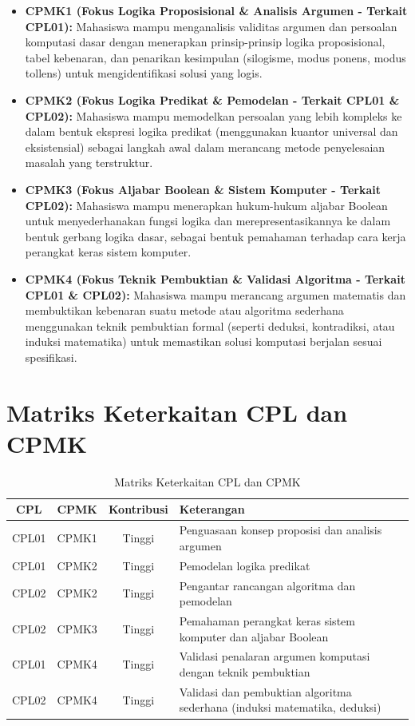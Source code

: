 \begin{itemize}
  \item \textbf{CPMK1 (Fokus Logika Proposisional \& Analisis Argumen - Terkait CPL01):} Mahasiswa mampu menganalisis validitas argumen dan persoalan komputasi dasar dengan menerapkan prinsip-prinsip logika proposisional, tabel kebenaran, dan penarikan kesimpulan (silogisme, modus ponens, modus tollens) untuk mengidentifikasi solusi yang logis.
  
  \item \textbf{CPMK2 (Fokus Logika Predikat \& Pemodelan - Terkait CPL01 \& CPL02):} Mahasiswa mampu memodelkan persoalan yang lebih kompleks ke dalam bentuk ekspresi logika predikat (menggunakan kuantor universal dan eksistensial) sebagai langkah awal dalam merancang metode penyelesaian masalah yang terstruktur.
  
  \item \textbf{CPMK3 (Fokus Aljabar Boolean \& Sistem Komputer - Terkait CPL02):} Mahasiswa mampu menerapkan hukum-hukum aljabar Boolean untuk menyederhanakan fungsi logika dan merepresentasikannya ke dalam bentuk gerbang logika dasar, sebagai bentuk pemahaman terhadap cara kerja perangkat keras sistem komputer.
  
  \item \textbf{CPMK4 (Fokus Teknik Pembuktian \& Validasi Algoritma - Terkait CPL01 \& CPL02):} Mahasiswa mampu merancang argumen matematis dan membuktikan kebenaran suatu metode atau algoritma sederhana menggunakan teknik pembuktian formal (seperti deduksi, kontradiksi, atau induksi matematika) untuk memastikan solusi komputasi berjalan sesuai spesifikasi.
\end{itemize}

\section*{Matriks Keterkaitan CPL dan CPMK}

\begin{table}[H]
\centering
\begin{tabular}{|c|c|c|>{\raggedright\arraybackslash}p{5.5cm}|}
  \hline
  \textbf{CPL} & \textbf{CPMK} & \textbf{Kontribusi} & \textbf{Keterangan} \\
  \hline
  CPL01 & CPMK1 & Tinggi & Penguasaan konsep proposisi dan analisis argumen \\
  \hline
  CPL01 & CPMK2 & Tinggi & Pemodelan logika predikat \\
  \hline
  CPL02 & CPMK2 & Tinggi & Pengantar rancangan algoritma dan pemodelan \\
  \hline
  CPL02 & CPMK3 & Tinggi & Pemahaman perangkat keras sistem komputer dan aljabar Boolean \\
  \hline
  CPL01 & CPMK4 & Tinggi & Validasi penalaran argumen komputasi dengan teknik pembuktian \\
  \hline
  CPL02 & CPMK4 & Tinggi & Validasi dan pembuktian algoritma sederhana (induksi matematika, deduksi) \\
  \hline
\end{tabular}
\caption{Matriks Keterkaitan CPL dan CPMK}
\end{table}

